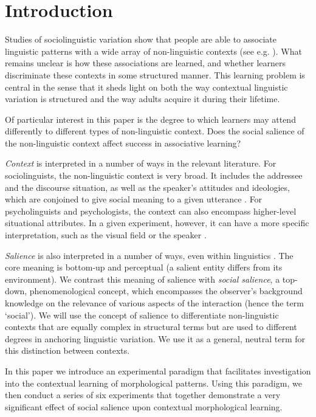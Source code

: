 \documentclass{frontiersSCNS} %
\begin{document}
\section{Introduction}

Studies of  sociolinguistic variation show that people are able to associate linguistic patterns with a wide array of non-linguistic contexts (see e.g. \citealt{hay2007sociophonetics,drager2010sociophonetic}).  What remains unclear is how these associations are learned, and whether learners discriminate these contexts in some structured manner. This learning problem is central in the sense that it sheds light on both the way contextual linguistic variation is structured and the way adults acquire it during their lifetime.

Of particular interest in this paper is the degree to which learners may attend differently to different types of non-linguistic context.  Does the social salience of the non-linguistic context affect success in associative learning?  


{\it Context} is interpreted in a number of ways in the relevant literature. For sociolinguists, the non-linguistic context is very broad. It includes the addressee and the discourse situation, as well as the speaker's attitudes and ideologies, which are conjoined to give social meaning to a given utterance \citep{eckert2008variation}. For psycholinguists and psychologists, the context can also encompass higher-level situational attributes. In a given experiment, however, it can have a more specific interpretation, such as the visual field \citep{chun1998contextual} or the speaker \citep{kraljic2008}.   

{\it Salience} is also interpreted in a number of ways, even within linguistics \citep{racz2013salience}. The core meaning is bottom-up and perceptual (a salient entity differs from its environment). We contrast this meaning of salience with {\it social salience}, a top-down, phenomenological concept, which encompasses the observer's background knowledge on the relevance of various aspects of the interaction (hence the term `social').     We will use the concept of salience to differentiate non-linguistic contexts that are equally complex in structural terms but are used to different degrees in anchoring linguistic variation. We use it as a general, neutral term for this distinction between contexts. 


In this paper we introduce an experimental paradigm that facilitates investigation into the contextual learning of morphological patterns. Using this paradigm, we then conduct a series of six experiments that together demonstrate a very significant effect of social salience upon contextual morphological learning.  
\end{document}
